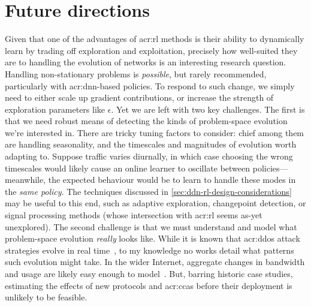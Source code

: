 \section{Future directions}



Given that one of the advantages of \gls{acr:rl} methods is their ability to dynamically learn by trading off exploration and exploitation, precisely how well-suited they are to handling the evolution of networks is an interesting research question.
Handling non-stationary problems is \emph{possible}, but rarely recommended, particularly with \gls{acr:dnn}-based policies.
To respond to such change, we simply need to either scale up gradient contributions, or increase the strength of exploration parameters like $\epsilon$.
Yet we are left with two key challenges.
The first is that we need robust means of detecting the kinds of problem-space evolution we're interested in.
There are tricky tuning factors to consider: chief among them are handling seasonality, and the timescales and magnitudes of evolution worth adapting to.
Suppose traffic varies diurnally, in which case choosing the wrong timescales would likely cause an online learner to oscillate between policies---meanwhile, the expected behaviour would be to learn to handle these modes in the \emph{same policy}.
The techniques discussed in \cref{sec:ddn-rl-design-considerations} may be useful to this end, such as adaptive exploration, changepoint detection, or signal processing methods (whose intersection with \gls{acr:rl} seems as-yet unexplored).
The second challenge is that we must understand and model what problem-space evolution \emph{really} looks like.
While it is known that \gls{acr:ddos} attack strategies evolve in real time~\parencite{DBLP:conf/spw/KangGS16}, to my knowledge no works detail what patterns such evolution might take.
In the wider Internet, aggregate changes in bandwidth and usage are likely easy enough to model~\parencite{DBLP:conf/anrw/BauerJHBC21}.
But, barring historic case studies, estimating the effects of new protocols and \glspl{acr:cca} before their deployment is unlikely to be feasible.

